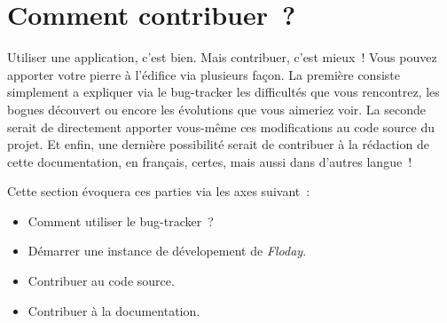 \section{Comment contribuer~?}
	\begin{intro}
	Utiliser une application, c'est bien. Mais contribuer, c'est mieux~!
	Vous pouvez apporter votre pierre à l'édifice via plusieurs façon.
	La première consiste simplement a expliquer via le bug-tracker les difficultés que vous rencontrez, les bogues découvert ou encore les évolutions que vous aimeriez voir.
	La seconde serait de directement apporter vous-même ces modifications au code source du projet.
	Et enfin, une dernière possibilité serait de contribuer à la rédaction de cette documentation, en français, certes, mais aussi dans d'autres langue~!

	Cette section évoquera ces parties via les axes suivant~:
	\begin{itemize}
		\item Comment utiliser le bug-tracker~?
		\item Démarrer une instance de dévelopement de \emph{Floday}.
		\item Contribuer au code source.
		\item Contribuer à la documentation.
	\end{itemize}
\end{intro}


